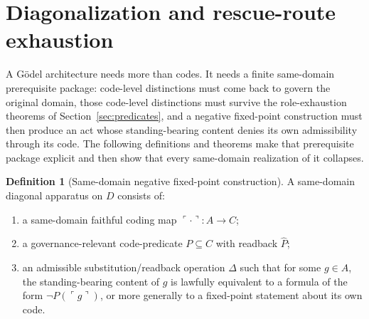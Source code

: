 \documentclass[11pt]{article}
\theoremstyle{plain}
\theoremstyle{definition}
\newtheorem{definition}[theorem]{Definition}
\newcommand{\code}[1]{\ulcorner #1 \urcorner}
\newcommand{\domain}{D}
\begin{document}
\section{Diagonalization and rescue-route exhaustion}
\label{sec:diagonal}

A G\"odel architecture needs more than codes. It needs a finite same-domain prerequisite package: code-level distinctions must come back to govern the original domain, those code-level distinctions must survive the role-exhaustion theorems of Section~\ref{sec:predicates}, and a negative fixed-point construction must then produce an act whose standing-bearing content denies its own admissibility through its code. The following definitions and theorems make that prerequisite package explicit and then show that every same-domain realization of it collapses.

\begin{definition}[Same-domain negative fixed-point construction]
A same-domain diagonal apparatus on $\domain$ consists of:
\begin{enumerate}[label=(\alph*), leftmargin=2.5em]
    \item a same-domain faithful coding map $\code{\cdot}:A\to C$;
    \item a governance-relevant code-predicate $P\subseteq C$ with readback $\widehat P$;
    \item an admissible substitution/readback operation $\Delta$ such that for some $g\in A$, the standing-bearing content of $g$ is lawfully equivalent to a formula of the form $\neg P(\code{g})$, or more generally to a fixed-point statement about its own code.
\end{enumerate}
\end{definition}
\end{document}

